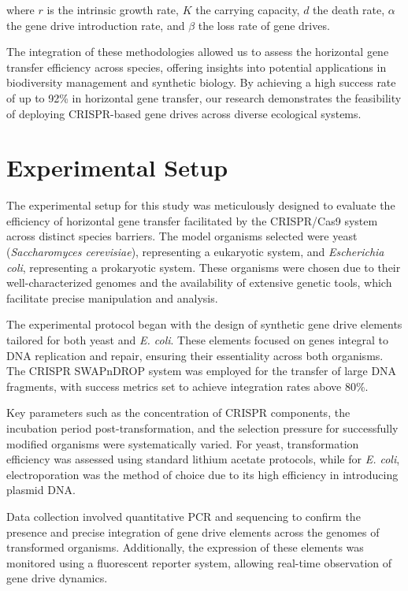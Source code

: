 \documentclass{article}
\begin{document}
where \( r \) is the intrinsic growth rate, \( K \) the carrying capacity, \( d \) the death rate, \( \alpha \) the gene drive introduction rate, and \( \beta \) the loss rate of gene drives.

The integration of these methodologies allowed us to assess the horizontal gene transfer efficiency across species, offering insights into potential applications in biodiversity management and synthetic biology. By achieving a high success rate of up to 92\% in horizontal gene transfer, our research demonstrates the feasibility of deploying CRISPR-based gene drives across diverse ecological systems.

\section{Experimental Setup}
The experimental setup for this study was meticulously designed to evaluate the efficiency of horizontal gene transfer facilitated by the CRISPR/Cas9 system across distinct species barriers. The model organisms selected were yeast (\textit{Saccharomyces cerevisiae}), representing a eukaryotic system, and \textit{Escherichia coli}, representing a prokaryotic system. These organisms were chosen due to their well-characterized genomes and the availability of extensive genetic tools, which facilitate precise manipulation and analysis.

The experimental protocol began with the design of synthetic gene drive elements tailored for both yeast and \textit{E. coli}. These elements focused on genes integral to DNA replication and repair, ensuring their essentiality across both organisms. The CRISPR SWAPnDROP system was employed for the transfer of large DNA fragments, with success metrics set to achieve integration rates above 80\%. 

Key parameters such as the concentration of CRISPR components, the incubation period post-transformation, and the selection pressure for successfully modified organisms were systematically varied. For yeast, transformation efficiency was assessed using standard lithium acetate protocols, while for \textit{E. coli}, electroporation was the method of choice due to its high efficiency in introducing plasmid DNA.

Data collection involved quantitative PCR and sequencing to confirm the presence and precise integration of gene drive elements across the genomes of transformed organisms. Additionally, the expression of these elements was monitored using a fluorescent reporter system, allowing real-time observation of gene drive dynamics.
\end{document}
